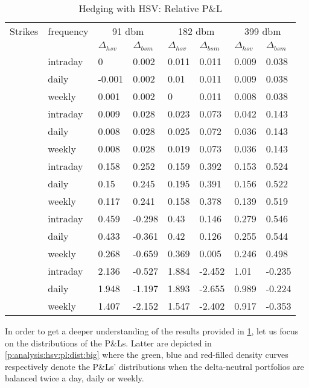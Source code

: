\documentclass[12pt]{report}
\begin{document}
\begin{table}[ht]
\centering
\begin{tabular}{llllllll}
  \hline
  \hline
Strikes & frequency  &\multicolumn{2}{c}{91 dbm} & \multicolumn{2}{c}{182 dbm} & \multicolumn{2}{c}{399 dbm} \\ 
   &  & $\Delta_{hsv}$ & $\Delta_{bsm}$ & $\Delta_{hsv}$ & $\Delta_{bsm}$ & $\Delta_{hsv}$ & $\Delta_{bsm}$ \\ 
   \hdashline
  \multirow{3}{*}{140} & intraday & 0 & 0.002 & 0.011 & 0.011 & 0.009 & 0.038 \\ 
  & daily & -0.001 & 0.002 & 0.01 & 0.011 & 0.009 & 0.038 \\ 
  & weekly & 0.001 & 0.002 & 0 & 0.011 & 0.008 & 0.038 \\ 
  \hdashline
  \multirow{3}{*}{160} & intraday & 0.009 & 0.028 & 0.023 & 0.073 & 0.042 & 0.143 \\ 
  & daily & 0.008 & 0.028 & 0.025 & 0.072 & 0.036 & 0.143 \\ 
  & weekly & 0.008 & 0.028 & 0.019 & 0.073 & 0.036 & 0.143 \\ 
  \hdashline
  \multirow{3}{*}{186} & intraday & 0.158 & 0.252 & 0.159 & 0.392 & 0.153 & 0.524 \\ 
  & daily & 0.15 & 0.245 & 0.195 & 0.391 & 0.156 & 0.522 \\ 
  & weekly & 0.117 & 0.241 & 0.158 & 0.378 & 0.139 & 0.519 \\ 
  \hdashline 
  \multirow{3}{*}{200} & intraday & 0.459 & -0.298 & 0.43 & 0.146 & 0.279 & 0.546 \\ 
  & daily & 0.433 & -0.361 & 0.42 & 0.126 & 0.255 & 0.544 \\ 
  & weekly & 0.268 & -0.659 & 0.369 & 0.005 & 0.246 & 0.498 \\ 
  \hdashline 
  \multirow{3}{*}{230} & intraday & 2.136 & -0.527 & 1.884 & -2.452 & 1.01 & -0.235 \\ 
  & daily & 1.948 & -1.197 & 1.893 & -2.655 & 0.989 & -0.224 \\ 
  & weekly & 1.407 & -2.152 & 1.547 & -2.402 & 0.917 & -0.353 \\ 
   \hline
\end{tabular}
\caption{Hedging with HSV: Relative P\&L} 
\label{t:analysis:heston:pl}
\end{table}


In order to get a deeper understanding of the results provided in \cref{t:analysis:heston:pl}, let us focus on the distributions of the P\&Ls. 
Latter are depicted in \cref{p:analysis:hsv:pl:dist:big} where the green, blue and red-filled density curves respectively denote the P\&Ls' distributions when the delta-neutral portfolios are balanced twice a day, daily or weekly.
\end{document}
